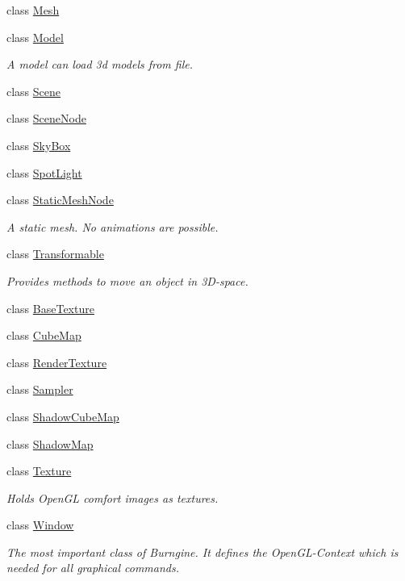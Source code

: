 \begin{DoxyCompactItemize}
class \hyperlink{classburn_1_1_mesh}{Mesh}
\item 
class \hyperlink{classburn_1_1_model}{Model}
\begin{DoxyCompactList}\small\item\em A model can load 3d models from file. \end{DoxyCompactList}\item 
class \hyperlink{classburn_1_1_scene}{Scene}
\item 
class \hyperlink{classburn_1_1_scene_node}{Scene\-Node}
\item 
class \hyperlink{classburn_1_1_sky_box}{Sky\-Box}
\item 
class \hyperlink{classburn_1_1_spot_light}{Spot\-Light}
\item 
class \hyperlink{classburn_1_1_static_mesh_node}{Static\-Mesh\-Node}
\begin{DoxyCompactList}\small\item\em A static mesh. No animations are possible. \end{DoxyCompactList}\item 
class \hyperlink{classburn_1_1_transformable}{Transformable}
\begin{DoxyCompactList}\small\item\em Provides methods to move an object in 3\-D-\/space. \end{DoxyCompactList}\item 
class \hyperlink{classburn_1_1_base_texture}{Base\-Texture}
\item 
class \hyperlink{classburn_1_1_cube_map}{Cube\-Map}
\item 
class \hyperlink{classburn_1_1_render_texture}{Render\-Texture}
\item 
class \hyperlink{classburn_1_1_sampler}{Sampler}
\item 
class \hyperlink{classburn_1_1_shadow_cube_map}{Shadow\-Cube\-Map}
\item 
class \hyperlink{classburn_1_1_shadow_map}{Shadow\-Map}
\item 
class \hyperlink{classburn_1_1_texture}{Texture}
\begin{DoxyCompactList}\small\item\em Holds Open\-G\-L comfort images as textures. \end{DoxyCompactList}\item 
class \hyperlink{classburn_1_1_window}{Window}
\begin{DoxyCompactList}\small\item\em The most important class of Burngine. It defines the Open\-G\-L-\/\-Context which is needed for all graphical commands. \end{DoxyCompactList}\item 

\end{DoxyCompactItemize}
